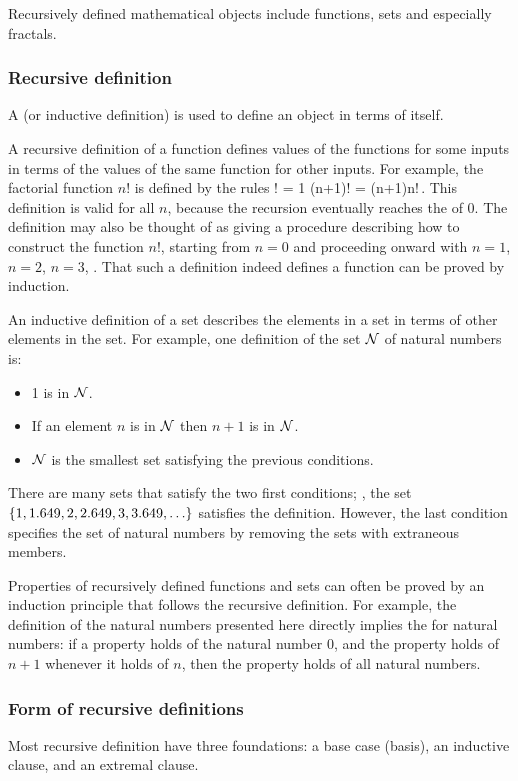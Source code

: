 Recursively defined mathematical objects include functions, sets and especially fractals.


\subsubsection{Recursive definition}
A  (or inductive definition) is used to define an object in terms of itself.

A recursive definition of a function defines values of the functions for some inputs in terms of the values of the same function for other inputs. For example, the factorial function $n!$ is defined by the rules
! = 1\qquad{}\qquad
(n+1)! = (n+1)n!\,.
\eeq
This definition is valid for all $n$, because the recursion eventually reaches the  of 0. The definition may also be thought of as giving a procedure describing how to construct the function $n!$, starting from $n = 0$ and proceeding onward with $n = 1$, $n = 2$, $n = 3$, \etc. That such a definition indeed defines a function can be proved by induction.

An inductive definition of a set describes the elements in a set in terms of other elements in the set. For example, one definition of the set $\mathcal{N}$ of natural numbers is:
\begin{itemize}
\item 1 is in $\mathcal{N}$.
\item If an element $n$ is in $\mathcal{N}$ then $n+1$ is in $\mathcal{N}$.
\item $\mathcal{N}$ is the smallest set satisfying the previous conditions.
\end{itemize}
There are many sets that satisfy the two first conditions; \eg, the set $\left\lbrace{1, 1.649, 2, 2.649, 3, 3.649, \dotsc}\right\rbrace$ satisfies the definition. However, the last condition specifies the set of natural numbers by removing the sets with extraneous members.

Properties of recursively defined functions and sets can often be proved by an induction principle that follows the recursive definition. For example, the definition of the natural numbers presented here directly implies the  for natural numbers: if a property holds of the natural number 0, and the property holds of $n+1$ whenever it holds of $n$, then the property holds of all natural numbers.


\subsubsection{Form of recursive definitions}
Most recursive definition have three foundations: a base case (basis), an inductive clause, and an extremal clause.

